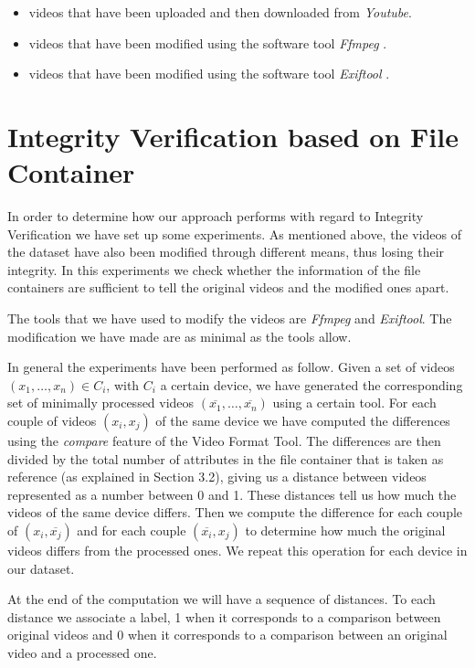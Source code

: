 \begin{itemize}
\item videos that have been uploaded and then downloaded from 	\emph{Youtube}.
\item videos that have been modified using the software tool \emph{Ffmpeg} \cite{ffmpeg}.
\item videos that have been modified using the software tool \emph{Exiftool} \cite{exiftool}.
\end{itemize}

\section{Integrity Verification based on File Container}

In order to determine how our approach performs with regard to Integrity Verification we have set up some experiments. As mentioned above, the videos of the dataset have also been modified through different means, thus losing their integrity. In this experiments we check whether the information of the file containers are sufficient to tell the original videos and the modified ones apart.

The tools that we have used to modify the videos are \emph{Ffmpeg} and \emph{Exiftool}. The modification we have made are as minimal as the tools allow.

In general the experiments have been performed as follow. Given a set of videos $(x_{1},\ldots,x_{n}) \in C_{i}$, with $C_{i}$ a certain device, we have generated the corresponding set of minimally processed videos $(\overline{x_{1}},\ldots,\overline{x_{n}})$ using a certain tool. For each couple of videos $(x_{i}, x_{j})$ of the same device we have computed the differences using the \emph{compare} feature of the Video Format Tool. The differences are then divided by the total number of attributes in the file container that is taken as reference (as explained in Section 3.2), giving us a distance between videos represented as a number between 0 and 1. These distances tell us how much the videos of the same device differs. Then we compute the difference for each couple of $(x_{i}, \overline{x_{j}})$ and for each couple $(\overline{x_{i}}, x_{j})$ to determine how much the original videos differs from the processed ones. We repeat this operation for each device in our dataset.

At the end of the computation we will have a sequence of distances. To each distance we associate a label, 1 when it corresponds to a comparison between original videos and 0 when it corresponds to a comparison between an original video and a processed one.

